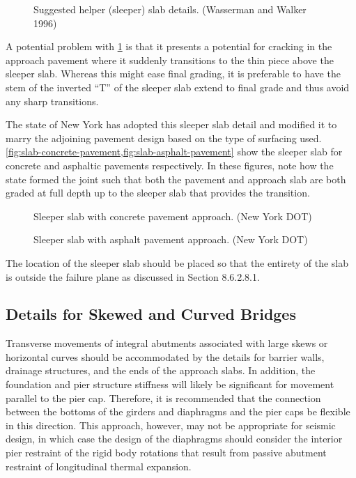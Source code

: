 \begin{figure}
  \caption{Suggested helper (sleeper) slab details. (Wasserman and Walker 1996)}
  \label{fig:sleeper-slab-detail}
\end{figure}

A potential problem with \cref{fig:sleeper-slab-detail} is that it presents a potential for cracking in the approach pavement where it
suddenly transitions to the thin piece above the sleeper slab. Whereas this might ease final grading, it is preferable to
have the stem of the inverted “T” of the sleeper slab extend to final grade and thus avoid any sharp transitions.

The state of New York has adopted this sleeper slab detail and modified it to marry the adjoining pavement design
based on the type of surfacing used. \cref{fig:slab-concrete-pavement,fig:slab-asphalt-pavement} show the sleeper slab for concrete and asphaltic
pavements respectively. In these figures, note how the state formed the joint such that both the pavement and
approach slab are both graded at full depth up to the sleeper slab that provides the transition.

\begin{figure}
  \caption{Sleeper slab with concrete pavement approach. (New York DOT)}
  \label{fig:slab-concrete-pavement}
\end{figure}
\begin{figure}
  \caption{Sleeper slab with asphalt pavement approach. (New York DOT)}
  \label{fig:slab-asphalt-pavement}
\end{figure}

The location of the sleeper slab should be placed so that the entirety of the slab is outside the failure plane as discussed in Section 8.6.2.8.1.

\subsection{Details for Skewed and Curved Bridges}
Transverse movements of integral abutments associated with large skews or horizontal curves should be accommodated by the details for barrier walls, drainage structures, and the ends of the approach slabs. In addition, the foundation and pier structure stiffness will likely be significant for movement parallel to the pier cap. Therefore, it is recommended that the connection between the bottoms of the girders and diaphragms and the pier caps be flexible in this direction. This approach, however, may not be appropriate for seismic design, in which case the design of the diaphragms should consider the interior pier restraint of the rigid body rotations that result from passive abutment restraint of longitudinal thermal expansion.


